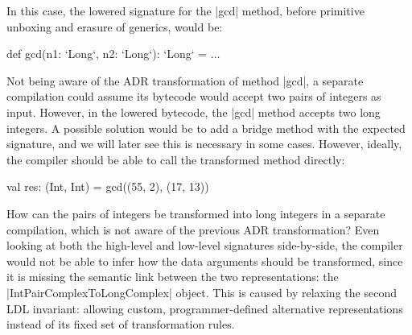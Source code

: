 In this case, the lowered signature for the |gcd| method, before primitive unboxing and erasure of generics, would be:

\begin{lstlisting-nobreak}
def gcd(n1: `Long`, n2: `Long`): `Long` = ...
\end{lstlisting-nobreak}

Not being aware of the ADR transformation of method |gcd|, a separate compilation could assume its bytecode would accept two pairs of integers as input. However, in the lowered bytecode, the |gcd| method accepts two long integers. A possible solution would be to add a bridge method with the expected signature, and we will later see this is necessary in some cases. However, ideally, the compiler should be able to call the transformed method directly:


\begin{lstlisting-nobreak}
val res: (Int, Int) = gcd((55, 2), (17, 13))
\end{lstlisting-nobreak}

How can the pairs of integers be transformed into long integers in a separate compilation, which is not aware of the previous ADR transformation? Even looking at both the high-level and low-level signatures side-by-side, the compiler would not be able to infer how the data arguments should be transformed, since it is missing the semantic link between the two representations: the |IntPairComplexToLongComplex| object. This is caused by relaxing the second LDL invariant: allowing custom, programmer-defined alternative representations instead of its fixed set of transformation rules.

